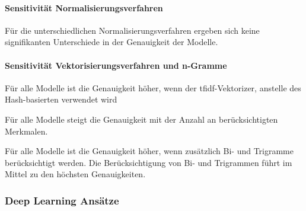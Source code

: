 \paragraph{Sensitivität Normalisierungsverfahren}

Für die unterschiedlichen Normalisierungsverfahren ergeben sich keine signifikanten Unterschiede in der Genauigkeit der Modelle.

\paragraph{Sensitivität Vektorisierungsverfahren und n-Gramme}

Für alle Modelle ist die Genauigkeit höher, wenn der \gls{tfidf}-Vektorizer, anstelle des Hash-basierten verwendet wird

Für alle Modelle steigt die Genauigkeit mit der Anzahl an berücksichtigten Merkmalen.

Für alle Modelle ist die Genauigkeit höher, wenn zusätzlich Bi- und Trigramme berücksichtigt werden.
Die Berücksichtigung von Bi- und Trigrammen führt im Mittel zu den höchsten Genauigkeiten.

\subsubsection{Deep Learning Ansätze}


